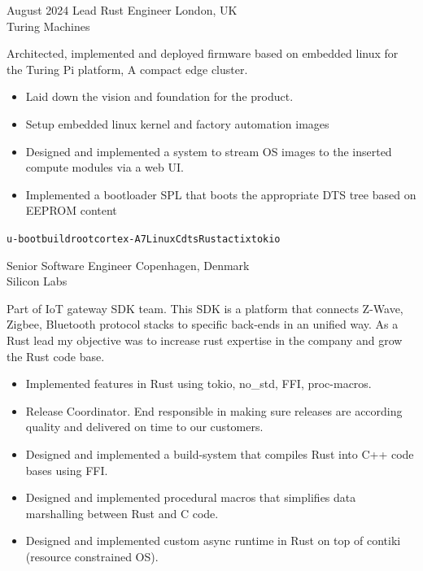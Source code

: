 \documentclass[9pt]{developercv} %
\begin{document}
\begin{entrylist}
	\entry
        { {August 2024} }
		{Lead Rust Engineer}
        {London, UK\\Turing Machines}
		{Architected, implemented and deployed firmware based on embedded linux
        for the Turing Pi platform, A compact edge cluster.
        \begin{itemize}
           \setlength\itemsep{-0.5em}
               \item {Laid down the vision and foundation for the product.}
               \item {Setup embedded linux kernel and factory automation images}
               \item {Designed and implemented a system to stream OS images to the inserted compute modules via a web UI.}
                \item {Implemented a bootloader SPL that boots the appropriate DTS tree based on EEPROM content}
          \end{itemize}
        \texttt{u-boot}\slashsep\texttt{buildroot}\slashsep\texttt{cortex-A7}\slashsep\texttt{Linux}\slashsep\texttt{C}\slashsep\texttt{dts}\slashsep\texttt{Rust}\slashsep\texttt{actix}\slashsep\texttt{tokio}
        }
	\entry
        {}
		{Senior Software Engineer}
        {Copenhagen, Denmark\\Silicon Labs}
		{Part of IoT gateway SDK team. This SDK is a platform that connects Z-Wave, Zigbee, Bluetooth protocol stacks to specific back-ends in an unified way. As a Rust lead my objective was to increase rust expertise in the company and grow the Rust code base.
          \begin{itemize}
           \setlength\itemsep{-0.5em}
                \item {Implemented features in Rust using tokio, no\_std, FFI, proc-macros.}
        		\item {Release Coordinator. End responsible in making sure releases are according quality and delivered on time to our customers.}
                \item {Designed and implemented a build-system that compiles Rust into C++ code bases using FFI.}
        		\item {Designed and implemented procedural macros that simplifies data marshalling between Rust and C code.}
        		\item {Designed and implemented custom async runtime in Rust on top of contiki (resource constrained OS).}

\end{itemize}}
\end{entrylist}
\end{document}
